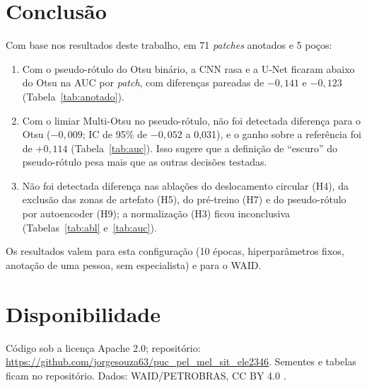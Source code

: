 \documentclass[12pt]{article}
\begin{document}
\section{Conclusão}

Com base nos resultados deste trabalho, em 71 \textit{patches} anotados e 5 poços:
\begin{enumerate}
\item Com o pseudo-rótulo do Otsu binário, a CNN rasa e a U-Net ficaram abaixo do Otsu na AUC por \textit{patch}, com diferenças pareadas de $-0{,}141$ e $-0{,}123$ (Tabela~\ref{tab:anotado}).
    \item Com o limiar Multi-Otsu no pseudo-rótulo, não foi detectada diferença para o Otsu ($-0{,}009$; IC de 95\% de $-0{,}052$ a 0,031), e o ganho sobre a referência foi de $+0{,}114$ (Tabela~\ref{tab:auc}). Isso sugere que a definição de ``escuro'' do pseudo-rótulo pesa mais que as outras decisões testadas.
\item Não foi detectada diferença nas ablações do deslocamento circular (H4), da exclusão das zonas de artefato (H5), do pré-treino (H7) e do pseudo-rótulo por autoencoder (H9); a normalização (H3) ficou inconclusiva (Tabelas~\ref{tab:abl} e~\ref{tab:auc}).
\end{enumerate}
Os resultados valem para esta configuração (10 épocas, hiperparâmetros fixos, anotação de uma pessoa, sem especialista) e para o WAID.

\section*{Disponibilidade}

Código sob a licença Apache 2.0; repositório: \url{https://github.com/jorgesouza63/puc_pel_mel_sit_ele2346}. Sementes e tabelas ficam no repositório. Dados: WAID/PETROBRAS, CC BY 4.0 \cite{waid}.



\end{document}
